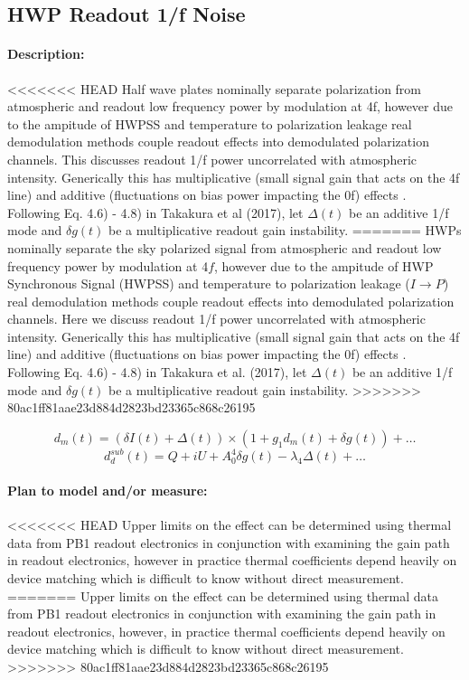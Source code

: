 
\subsection{HWP Readout 1/f Noise}


\paragraph{Description:}
<<<<<<< HEAD
Half wave plates nominally separate polarization from atmospheric and readout low frequency power by modulation at 4f, however due to the ampitude of HWPSS and temperature to polarization leakage real demodulation methods couple readout effects into demodulated polarization channels. 
This discusses readout 1/f power uncorrelated with atmospheric intensity. Generically this has multiplicative (small signal gain that acts on the 4f line) and additive (fluctuations on bias power impacting the 0f) effects . Following Eq. 4.6) - 4.8) in Takakura et al (2017), let $\Delta(t)$ be an additive 1/f mode and $\delta g(t)$ be a multiplicative readout gain instability.
=======
HWPs nominally separate the sky polarized signal from atmospheric and readout low frequency power by modulation at 4$f$, however due to the ampitude of HWP Synchronous Signal (HWPSS) and temperature to polarization leakage ($I \rightarrow P$) real demodulation methods couple readout effects into demodulated polarization channels. 
Here we discuss readout 1/f power uncorrelated with atmospheric intensity. Generically this has multiplicative (small signal gain that acts on the 4f line) and additive (fluctuations on bias power impacting the 0f) effects . Following Eq. 4.6) - 4.8) in Takakura et al. (2017), let $\Delta(t)$ be an additive 1/f mode and $\delta g(t)$ be a multiplicative readout gain instability.
>>>>>>> 80ac1ff81aae23d884d2823bd23365c868c26195

$$
d_{m}(t) = (\delta I (t) + \Delta (t)) \times (1 + g_{1}d_{m}(t) + \delta g(t)) + …
$$
$$
d_{d}^{sub}(t) = Q + iU + A_{0}^{4} \delta g(t) - \lambda_{4} \Delta (t) + …
$$

\paragraph{Plan to model and/or measure:}
<<<<<<< HEAD
Upper limits on the effect can be determined using thermal data from PB1 readout electronics in conjunction with examining the gain path in readout electronics, however in practice thermal coefficients depend heavily on device matching which is difficult to know without direct measurement.
=======
Upper limits on the effect can be determined using thermal data from PB1 readout electronics in conjunction with examining the gain path in readout electronics, however, in practice thermal coefficients depend heavily on device matching which is difficult to know without direct measurement.
>>>>>>> 80ac1ff81aae23d884d2823bd23365c868c26195

